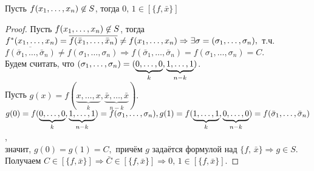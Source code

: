\begin{lemma}  Пусть $f(x_1, \ldots, x_n)\not\in S$, тогда $0,\,1 \in [\{f, \bar{x}\}]$
\end{lemma}
\begin{proof} 
    Пусть $f(x_1, \ldots, x_n)\not\in S$, тогда  $f^*(x_1, \ldots, x_n) = \overline{f(\bar{x}_1,\ldots,\bar{x}_n)} \neq f(x_1, \ldots, x_n) \Rightarrow \exists \sigma = (\sigma_1,\ldots,\sigma_n),$ т.ч. $\overline{f(\bar{\sigma}_1,\ldots,\bar{\sigma}_n)} \neq f(\sigma_1,\ldots,\sigma_n) \Rightarrow f(\bar{\sigma}_1,\ldots,\bar{\sigma}_n) = f(\sigma_1,\ldots,\sigma_n) = C.$\\
    Будем считать, что $(\sigma_1, \ldots, \sigma_n) = (\underbrace{0,\ldots,0}_k,\underbrace{1,\ldots,1}_{n-k})$.\\
    Пусть $g(x) = f(\underbrace{x,\ldots,x}_k,\underbrace{ \bar{x},\ldots,\bar{x}}_{n-k}).$\\
    $g(0) = f(\underbrace{0,\ldots,0}_k,\underbrace{ 1,\ldots,1}_{n-k}) = f(\sigma_1, \ldots, \sigma_n),\\
    g(1)= f(\underbrace{1,\ldots,1}_k,\underbrace{ 0,\ldots,0}_{n-k}) = f(\bar{\sigma}_1,\ldots,\bar{\sigma}_n)$,\\ значит, 
    $g(0) = g(1) = C, $ причём $g$ задаётся формулой над $\{f,\,\bar{x}\} \Rightarrow g \in S$.\\
    Получаем $C \in  [\{f, \bar{x}\}] \Rightarrow \bar{C} \in [\{f, \bar{x}\}] \Rightarrow 0,\,1 \in [\{f, \bar{x}\}].$
\end{proof}